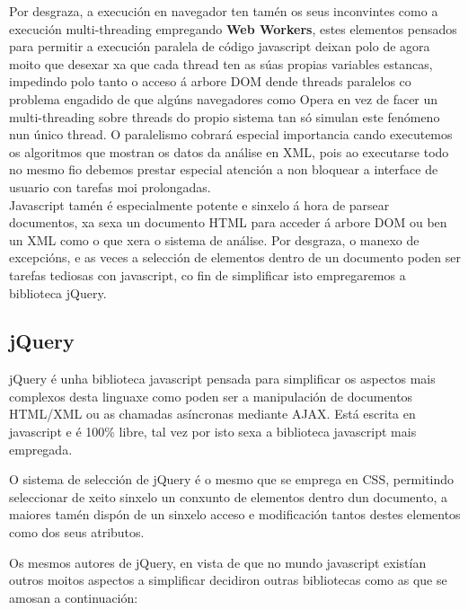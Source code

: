         Por desgraza, a execución en navegador ten tamén os seus inconvintes como a execución 
        multi-threading empregando \textbf{Web Workers}, estes elementos pensados para permitir
        a execución paralela de código javascript deixan polo de agora moito que desexar xa que 
        cada thread ten as súas propias variables estancas, impedindo polo tanto o acceso á 
        arbore DOM dende threads paralelos co problema engadido de que algúns navegadores como 
        Opera en vez de facer un multi-threading sobre threads do propio sistema  tan só simulan
        este fenómeno nun único thread. O paralelismo cobrará especial importancia 
        cando executemos os algoritmos que mostran os datos da análise en XML, pois ao 
        executarse todo no mesmo fio debemos prestar especial atención a non bloquear a 
        interface de usuario con tarefas moi prolongadas.\\
    
        Javascript tamén é especialmente potente e sinxelo á hora de parsear documentos, xa sexa
        un documento HTML para acceder á arbore DOM ou ben un XML como o que xera o sistema de 
        análise. Por desgraza, o manexo de excepcións, e as veces a selección de elementos dentro de un 
        documento poden ser tarefas tediosas con javascript, co fin de simplificar isto empregaremos
        a biblioteca jQuery.
            
        \subsection{jQuery}
        
            jQuery é unha biblioteca javascript pensada para simplificar os aspectos mais complexos desta 
            linguaxe como poden ser a manipulación de documentos HTML/XML ou as chamadas asíncronas 
            mediante AJAX. Está escrita en javascript e é 100\% libre, tal vez por isto sexa a biblioteca
            javascript mais empregada.
            
            O sistema de selección de jQuery é o mesmo que se emprega en CSS, permitindo seleccionar de 
            xeito sinxelo un conxunto de elementos dentro dun documento, a maiores tamén dispón de un 
            sinxelo acceso e modificación tantos destes elementos como dos seus atributos.
            
            Os mesmos autores de jQuery, en vista de que no mundo javascript existían outros moitos
            aspectos a simplificar decidiron outras bibliotecas como as que se amosan a continuación:
            
